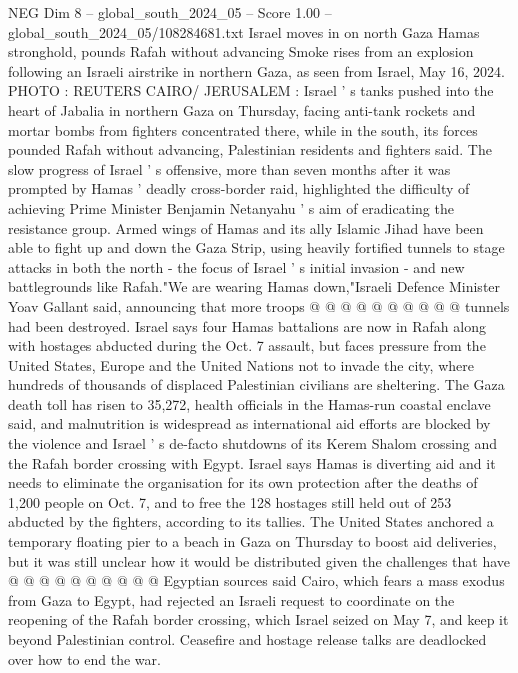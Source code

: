 \begin{textsample}{NEG Dim 8 – global\_south\_2024\_05 – Score 1.00 – global\_south\_2024\_05/108284681.txt}  \label{ex:f8_neg_233}
Israel moves in on north Gaza Hamas stronghold, pounds Rafah without advancing Smoke rises from an explosion following an Israeli airstrike in northern Gaza, as seen from Israel, May 16, 2024.
PHOTO : REUTERS CAIRO/ JERUSALEM : Israel ' s tanks pushed into the heart of Jabalia in northern Gaza on Thursday, facing anti-tank rockets and mortar bombs from fighters concentrated there, while in the south, its forces pounded Rafah without advancing, Palestinian residents and fighters said.
The slow progress of Israel ' s offensive, more than seven months after it was prompted by Hamas ' deadly cross-border raid, highlighted the difficulty of achieving Prime Minister Benjamin Netanyahu ' s aim of eradicating the resistance group.
Armed wings of Hamas and its ally Islamic Jihad have been able to fight up and down the Gaza Strip, using heavily fortified tunnels to stage attacks in both the north - the focus of Israel ' s initial invasion - and new battlegrounds like Rafah."We are wearing Hamas down,"Israeli Defence Minister Yoav Gallant said, announcing that more troops @ @ @ @ @ @ @ @ @ @ tunnels had been destroyed.
Israel says four Hamas battalions are now in Rafah along with hostages abducted during the Oct. 7 assault, but faces pressure from the United States, Europe and the United Nations not to invade the city, where hundreds of thousands of displaced Palestinian civilians are sheltering.
The Gaza death toll has risen to 35,272, health officials in the Hamas-run coastal enclave said, and malnutrition is widespread as international aid efforts are blocked by the violence and Israel ' s de-facto shutdowns of its Kerem Shalom crossing and the Rafah border crossing with Egypt.
Israel says Hamas is diverting aid and it needs to eliminate the organisation for its own protection after the deaths of 1,200 people on Oct. 7, and to free the 128 hostages still held out of 253 abducted by the fighters, according to its tallies.
The United States anchored a temporary floating pier to a beach in Gaza on Thursday to boost aid deliveries, but it was still unclear how it would be distributed given the challenges that have @ @ @ @ @ @ @ @ @ @ Egyptian sources said Cairo, which fears a mass exodus from Gaza to Egypt, had rejected an Israeli request to coordinate on the reopening of the Rafah border crossing, which Israel seized on May 7, and keep it beyond Palestinian control.
Ceasefire and hostage release talks are deadlocked over how to end the war.

\end{textsample}
